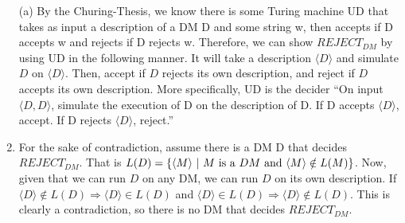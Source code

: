 \begin{solution}

\begin{enumerate}
	\item [(a)] By the Churing-Thesis, we know there is some Turing machine UD that takes as input a description of a DM D and some string w, then accepts if D accepts w and rejects if D rejects w. Therefore, we can show $REJECT_{DM}$ by using UD in the following manner. It will take a description $\langle D \rangle $ and simulate $D$ on $\langle D \rangle$. Then, accept if $D$ rejects its own description, and reject if $D$ accepts its own description. More specifically, UD is the decider ``On input $\langle D, D \rangle$, 
	simulate the execution of D on the description of D. If D accepts $\langle D \rangle$, accept. If D rejects $\langle D \rangle$, reject.''
	\item For the sake of contradiction, assume there is a DM D that decides $REJECT_{DM}$. That is $L(D) = \{\langle M \rangle ~|~ M \mbox{ is a }DM\\ \mbox{ and } \langle M \rangle \notin L(M)\}$. Now, given that we can run $D$ on any DM, we can run $D$ on its own description. If $\langle D \rangle \notin L(D) \Longrightarrow \langle D \rangle \in L(D)$ and $\langle D \rangle \in L(D) \Longrightarrow \langle D \rangle \notin L(D)$. This is clearly a contradiction, so there is no DM that decides $REJECT_{DM}$.
\end{enumerate}

\end{solution}
